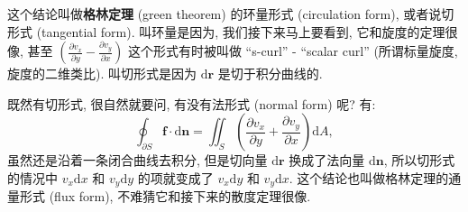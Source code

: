 这个结论叫做\textbf{格林定理} (green theorem) 的环量形式 (circulation
form), 或者说切形式 (tangential form). 叫环量是因为,
我们接下来马上要看到, 它和旋度的定理很像, 甚至
$\left(\frac{\partial v_x}{\partial y}-\frac{\partial v_y}{\partial x}\right)$
这个形式有时被叫做 ``s-curl'' - ``scalar curl'' (所谓标量旋度,
旋度的二维类比). 叫切形式是因为 $\mathrm{d}\boldsymbol{r}$
是切于积分曲线的.

既然有切形式, 很自然就要问, 有没有法形式 (normal form) 呢? 有: \[
\boxed{\oint_{\partial S}\boldsymbol{f}\cdot\mathrm{d}\boldsymbol{n}=\iint_S\left(\frac{\partial v_x}{\partial y}+\frac{\partial v_y}{\partial x}\right)\mathrm{d}A},
\] 虽然还是沿着一条闭合曲线去积分, 但是切向量
$\mathrm{d}\boldsymbol{r}$ 换成了法向量 $\mathrm{d}\boldsymbol{n}$,
所以切形式的情况中 $v_x\mathrm{d}x$ 和 $v_y\mathrm{d}y$ 的项就变成了
$v_x\mathrm{d}y$ 和 $v_y\mathrm{d}x$.
这个结论也叫做格林定理的通量形式 (flux form),
不难猜它和接下来的散度定理很像.
